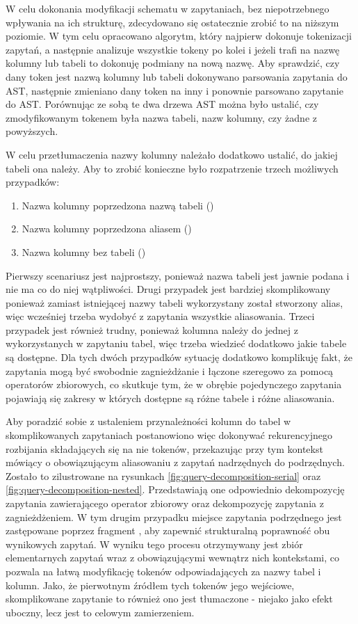 W celu dokonania modyfikacji schematu w zapytaniach, bez niepotrzebnego wpływania na ich strukturę, zdecydowano się ostatecznie zrobić to na niższym poziomie. W tym celu opracowano algorytm, który najpierw dokonuje tokenizacji zapytań, a następnie analizuje wszystkie tokeny po kolei i jeżeli trafi na nazwę kolumny lub tabeli to dokonuję podmiany na nową nazwę. Aby sprawdzić, czy dany token jest nazwą kolumny lub tabeli dokonywano parsowania zapytania do AST, następnie zmieniano dany token na inny i ponownie parsowano zapytanie do AST. Porównując ze sobą te dwa drzewa AST można było ustalić, czy zmodyfikowanym tokenem była nazwa tabeli, nazw kolumny, czy żadne z powyższych.

W celu przetłumaczenia nazwy kolumny należało dodatkowo ustalić, do jakiej tabeli ona należy. Aby to zrobić konieczne było rozpatrzenie trzech możliwych przypadków:

\begin{enumerate}
    \item Nazwa kolumny poprzedzona nazwą tabeli ()
    \item Nazwa kolumny poprzedzona aliasem ()
    \item Nazwa kolumny bez tabeli ()
\end{enumerate}

Pierwszy scenariusz jest najprostszy, ponieważ nazwa tabeli jest jawnie podana i nie ma co do niej wątpliwości. Drugi przypadek jest bardziej skomplikowany ponieważ zamiast istniejącej nazwy tabeli wykorzystany został stworzony alias, więc wcześniej trzeba wydobyć z zapytania wszystkie aliasowania. Trzeci przypadek jest również trudny, ponieważ kolumna należy do jednej z wykorzystanych w zapytaniu tabel, więc trzeba wiedzieć dodatkowo jakie tabele są dostępne. Dla tych dwóch przypadków sytuację dodatkowo komplikuję fakt, że zapytania mogą być swobodnie zagnieżdżanie i łączone szeregowo za pomocą operatorów zbiorowych, co skutkuje tym, że w obrębie pojedynczego zapytania pojawiają się zakresy w których dostępne są różne tabele i różne aliasowania.

Aby poradzić sobie z ustaleniem przynależności kolumn do tabel w skomplikowanych zapytaniach postanowiono więc dokonywać rekurencyjnego rozbijania składających się na nie tokenów, przekazując przy tym kontekst mówiący o obowiązującym aliasowaniu z zapytań nadrzędnych do podrzędnych. Zostało to zilustrowane na rysunkach 
\ref{fig:query-decomposition-serial} oraz \ref{fig:query-decomposition-nested}. Przedstawiają one odpowiednio dekompozycję zapytania zawierającego operator zbiorowy oraz dekompozycję zapytania z zagnieżdżeniem. W tym drugim przypadku miejsce zapytania podrzędnego jest zastępowane poprzez fragment , aby zapewnić strukturalną poprawność obu wynikowych zapytań. W wyniku tego procesu otrzymywany jest zbiór elementarnych zapytań wraz z obowiązującymi wewnątrz nich kontekstami, co pozwala na łatwą modyfikację tokenów odpowiadających za nazwy tabel i kolumn. Jako, że pierwotnym źródłem tych tokenów jego wejściowe, skomplikowane zapytanie to również ono jest tłumaczone - niejako jako efekt uboczny, lecz jest to celowym zamierzeniem.


